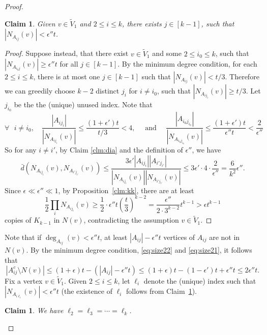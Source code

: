 \documentclass[reqno]{amsart}
\theoremstyle{plain}
\newtheorem{claim}[theorem]{Claim}
\def\eps{\epsilon}
\begin{document}
\begin{proof}
\begin{claim}\label{clm:v1}
Given $v\in \tilde V_1$ and $2\le i \le k$, there exists $j\in [k-1]$, such that $|N_{A_{ij}}(v)|<\eps''t$.
\end{claim}

\begin{proof}
Suppose instead, that there exist $v\in \tilde{V}_1$ and some $2\le i_0\le k$, such that $|N_{A_{i_0 j}}(v)|\ge \eps''t$ for all $j\in [k-1]$. By the minimum degree condition, for each $2\le i\le k$, there is at most one $j\in [k-1]$ such that $|N_{A_{ij}}(v)|< t/3$. Therefore we can greedily choose $k - 2$ distinct $j_i$ for $i\ne i_0$, such that $|N_{A_{ij_i}}(v)|\ge t/3$. Let $j_{i_0}$ be the the (unique) unused index. Note that
\[
\forall \text{ } i\ne i_0, \quad \frac{|A_{ij_i}|}{|N_{A_{ij_i}}(v)|}\le \frac{(1 + \eps') t}{t/3}<4, \quad \text{ and } \quad \frac {|A_{i_0 j_{i_0}}|} {|N_{A_{i_0 j_{i_0}}}(v)|} \le \frac {(1 + \eps') t}{\eps'' t}<\frac 2{\eps''}
\]
So for any $i\ne i'$, by Claim \ref{clm:dia} and the definition of $\eps''$, we have
\begin{equation}\label{eq:v1}
\bar d(N_{A_{ij_i}}(v), N_{A_{i'j_{i'}}}(v)) \le \frac{3\eps' |A_{ij_i}||A_{i'j_{i'}}|}{|N_{A_{ij_i}}(v)||N_{A_{i'j_{i'}}}(v)|}  \le 3\eps' \cdot 4\cdot \frac{2}{\eps'' } = \frac 6{k^2}\eps''.
\end{equation}
Since $\eps \ll \eps'' \ll 1$, by Proposition~\ref{clm:kk}, there are at least
\[
\frac12 \prod_i N_{A_{ij_i}}(v) \ge \frac12 \cdot \eps''t \left(\frac t3 \right)^{k-2} = \frac{\eps''}{2\cdot 3^{k-2}}t^{k-1} > \eps t^{k-1}
\]
copies of $K_{k-1}$ in $N(v)$, contradicting the assumption $v\in \tilde V_1$.
\end{proof}

Note that if $\deg_{A_{ij}}(v)< \eps'' t$, at least $|A_{i j}| - \eps'' t$ vertices of $A_{i j}$ are not in $N(v)$. By the minimum degree condition, \eqref{eq:size22} and \eqref{eq:size21}, it follows that
\begin{equation}
\label{eq:deg1}
|A^c_{i j} \setminus N(v)| \le (1+ \eps)t - (|A_{ij}| - \eps'' t)\le (1+ \eps)t - (1- \eps') t + \eps'' t \le 2 \epsilon'' t.
\end{equation}
Fix a vertex $v\in \tilde V_1$. Given $2\le i\le k$, let $\ell_i$ denote the (unique) index such that $|N_{A_{i \ell_i}}(v)| < \eps'' t$ (the existence of $\ell_i$ follows from Claim~\ref{clm:v1}).

\begin{claim}\label{clm:li=l2}
We have $\ell_2 = \ell_3 = \cdots = \ell_k$.
\end{claim}


\end{proof}
\end{document}
